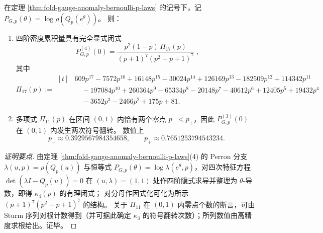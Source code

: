 \begin{proposition}[四阶密度累积量的完全显式式与三阶符号翻转结构]\label{prop:fold-gauge-anomaly-bernoulli-p-kappa4-and-kappa3-signflip}
在定理 \ref{thm:fold-gauge-anomaly-bernoulli-p-laws} 的记号下，记 \(P_{G,p}(\theta)=\log\rho(Q_p(e^\theta))\)。
则：
\begin{enumerate}
  \item 四阶密度累积量具有完全显式闭式
  \[
  \boxed{\;
  P_{G,p}^{(4)}(0)=\frac{p^2(1-p)\,\Pi_{17}(p)}{(p+1)^7(p^2-p+1)^7}\;},
  \]
  其中
  \[
  \Pi_{17}(p):=
  \begin{aligned}[t]
  &609p^{17}-7572p^{16}+16148p^{15}-30024p^{14}+126169p^{13}-182509p^{12}+114342p^{11}\\
  &\quad-197084p^{10}+260364p^9-65334p^8-20148p^7-40612p^6+12405p^5+19432p^4\\
  &\quad-3652p^3-2466p^2+175p+81.
  \end{aligned}
  \]
  \item 多项式 \(\Pi_{11}(p)\) 在区间 \((0,1)\) 内恰有两个零点 \(p_-<p_+\)，因此 \(P_{G,p}^{(3)}(0)\) 在 \((0,1)\) 内发生两次符号翻转。
  数值上
  \[
  p_-\approx 0.3929567984354658,\qquad
  p_+\approx 0.7651253794543234.
  \]
\end{enumerate}
\end{proposition}
\begin{proof}[证明要点]
由定理 \ref{thm:fold-gauge-anomaly-bernoulli-p-laws}(4) 的 Perron 分支 \(\lambda(u,p)=\rho(Q_p(u))\) 与恒等式
\(
P_{G,p}(\theta)=\log\lambda(e^\theta,p)
\)，对四次特征方程 \(\det(\lambda I-Q_p(u))=0\) 在 \((u,\lambda)=(1,1)\) 处作四阶隐式求导并整理为 \(\theta\)-导数，即得 \(\kappa_4(p)\) 的有理闭式；
对分母作因式化可化为所示 \((p+1)^7(p^2-p+1)^7\) 的结构。
关于 \(\Pi_{11}\) 在 \((0,1)\) 内零点个数的断言，可由 Sturm 序列对根计数得到（并可据此确定 \(\kappa_3\) 的符号翻转次数）；所列数值由高精度求根给出。证毕。
\end{proof}

\endinput
